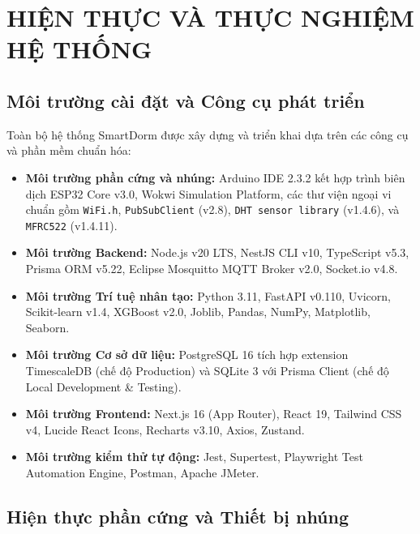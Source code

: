 \chapter{HIỆN THỰC VÀ THỰC NGHIỆM HỆ THỐNG}
\label{ch:chuong4}

\section{Môi trường cài đặt và Công cụ phát triển}
\label{sec:moi_truong_cai_dat}

Toàn bộ hệ thống SmartDorm được xây dựng và triển khai dựa trên các công cụ và phần mềm chuẩn hóa:
\begin{itemize}
    \item \textbf{Môi trường phần cứng và nhúng:} Arduino IDE 2.3.2 kết hợp trình biên dịch ESP32 Core v3.0, Wokwi Simulation Platform, các thư viện ngoại vi chuẩn gồm \texttt{WiFi.h}, \texttt{PubSubClient} (v2.8), \texttt{DHT sensor library} (v1.4.6), và \texttt{MFRC522} (v1.4.11).
    \item \textbf{Môi trường Backend:} Node.js v20 LTS, NestJS CLI v10, TypeScript v5.3, Prisma ORM v5.22, Eclipse Mosquitto MQTT Broker v2.0, Socket.io v4.8.
    \item \textbf{Môi trường Trí tuệ nhân tạo:} Python 3.11, FastAPI v0.110, Uvicorn, Scikit-learn v1.4, XGBoost v2.0, Joblib, Pandas, NumPy, Matplotlib, Seaborn.
    \item \textbf{Môi trường Cơ sở dữ liệu:} PostgreSQL 16 tích hợp extension TimescaleDB (chế độ Production) và SQLite 3 với Prisma Client (chế độ Local Development \& Testing).
    \item \textbf{Môi trường Frontend:} Next.js 16 (App Router), React 19, Tailwind CSS v4, Lucide React Icons, Recharts v3.10, Axios, Zustand.
    \item \textbf{Môi trường kiểm thử tự động:} Jest, Supertest, Playwright Test Automation Engine, Postman, Apache JMeter.
\end{itemize}

\section{Hiện thực phần cứng và Thiết bị nhúng}
\label{sec:hien_thuc_phan_cung}

